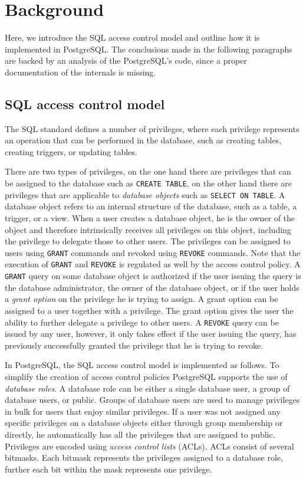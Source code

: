 \section{Background}

Here, we introduce the SQL access control model and outline how it is implemented in PostgreSQL.
%
The conclusions made in the following paragraphs are backed by an analysis of the  PostgreSQL's code, since a proper documentation of the internals is missing.

\subsection{SQL access control model}

The SQL standard defines a number of privileges, where each privilege represents an operation that can be performed in the database, such as creating tables, creating triggers, or updating tables.

There are two types of privileges, on the one hand there are privileges that can be assigned to the database such as \texttt{CREATE TABLE}, on the other hand there are privileges that are applicable to \emph{database objects} such as \texttt{SELECT ON TABLE}.
%
A database object refers to an internal structure of the database, such as a table, a trigger, or a view. 
%
When a user creates a database object, he is the owner of the object and therefore intrinsically receives all privileges on this object, including the privilege to delegate those to other users.
%
The privileges can be assigned to users using \texttt{GRANT} commands and revoked using \texttt{REVOKE} commands.
%
Note that the execution of  \texttt{GRANT} and \texttt{REVOKE} is regulated as well by the access control policy. 
%
A \texttt{GRANT} query on some database object is authorized if the user issuing the query is the database administrator, the owner of the database object, or if the user holds a \emph{grant option} on the privilege he is trying to assign.
%
A grant option can be assigned to a user together with a privilege.
%
The grant option gives the user the ability to further delegate a privilege to other users.
%
A \texttt{REVOKE} query can be issued by any user, however, it only takes effect if the user issuing the query, has previously successfully granted the privilege that he is trying to revoke.

In PostgreSQL, the SQL access control model is implemented as follows.
%
To simplify the creation of access control policies PostgreSQL supports the use of \emph{database roles}.
%
A database role can be either a single database user, a group of database users, or public. 
%
Groups of database users are used to manage privileges in bulk for users that enjoy similar privileges.
%
If a user was not assigned any specific privileges on a database objects either through group membership or directly, he automatically has all the privileges that are assigned to public.
%
Privileges are encoded using \emph{access control lists} (ACLs).
%
ACLs consist of several bitmasks.
%
Each bitmask represents the privileges assigned to a database role, further each bit within the mask represents one privilege.

